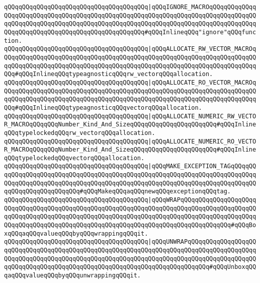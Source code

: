 \verb|qQQqqQQqqQQqqQQqqQQqqQQqqQQqqQQqqQQqqQQq|\verb#|qQQqIGNORE_MACROqQQqqQQqqQQqqQQqqQQqqQQqqQQqqQQqqQQqqQQqqQQqqQQqqQQqqQQqqQQqqQQqqQQqqQQqqQQqqQQqqQQqqQQqqQQqqQQqqQQqqQQqqQQqqQQqqQQqqQQqqQQqqQQqqQQqqQQqqQQqqQQqqQQqqQQqqQQqqQQqqQQqqQQqqQQqqQQqqQQqqQQqqQQqqQQq#\verb|#qQQqInlineqQQq"ignore"qQQqfunction.|\newline
\verb|qQQqqQQqqQQqqQQqqQQqqQQqqQQqqQQqqQQqqQQq|\verb#|qQQqALLOCATE_RW_VECTOR_MACROqQQqqQQqqQQqqQQqqQQqqQQqqQQqqQQqqQQqqQQqqQQqqQQqqQQqqQQqqQQqqQQqqQQqqQQqqQQqqQQqqQQqqQQqqQQqqQQqqQQqqQQqqQQqqQQqqQQqqQQqqQQqqQQqqQQqqQQqqQQqqQQq#\verb|#qQQqInlineqQQqtypeagnosticqQQqrw_vectorqQQqallocation.|\newline
\verb|qQQqqQQqqQQqqQQqqQQqqQQqqQQqqQQqqQQqqQQq|\verb#|qQQqALLOCATE_RO_VECTOR_MACROqQQqqQQqqQQqqQQqqQQqqQQqqQQqqQQqqQQqqQQqqQQqqQQqqQQqqQQqqQQqqQQqqQQqqQQqqQQqqQQqqQQqqQQqqQQqqQQqqQQqqQQqqQQqqQQqqQQqqQQqqQQqqQQqqQQqqQQqqQQqqQQq#\verb|#qQQqInlineqQQqtypeagnosticqQQqvectorqQQqallocation.|\newline
\verb|qQQqqQQqqQQqqQQqqQQqqQQqqQQqqQQqqQQqqQQq|\verb#|qQQqALLOCATE_NUMERIC_RW_VECTOR_MACROqQQqqQQqNumber_Kind_And_SizeqQQqqQQqqQQqqQQqqQQqqQQq#\verb|#qQQqInlineqQQqtypelockedqQQqrw_vectorqQQqallocation.|\newline
\verb|qQQqqQQqqQQqqQQqqQQqqQQqqQQqqQQqqQQqqQQq|\verb#|qQQqALLOCATE_NUMERIC_RO_VECTOR_MACROqQQqqQQqNumber_Kind_And_SizeqQQqqQQqqQQqqQQqqQQqqQQq#\verb|#qQQqInlineqQQqtypelockedqQQqvectorqQQqallocation.|\newline
\newline
\verb|qQQqqQQqqQQqqQQqqQQqqQQqqQQqqQQqqQQqqQQq|\verb#|qQQqMAKE_EXCEPTION_TAGqQQqqQQqqQQqqQQqqQQqqQQqqQQqqQQqqQQqqQQqqQQqqQQqqQQqqQQqqQQqqQQqqQQqqQQqqQQqqQQqqQQqqQQqqQQqqQQqqQQqqQQqqQQqqQQqqQQqqQQqqQQqqQQqqQQqqQQqqQQqqQQqqQQqqQQqqQQqqQQqqQQqqQQq#\verb|#qQQqMakeqQQqaqQQqnewqQQqexceptionqQQqtag.|\newline
\verb|qQQqqQQqqQQqqQQqqQQqqQQqqQQqqQQqqQQqqQQq|\verb#|qQQqWRAPqQQqqQQqqQQqqQQqqQQqqQQqqQQqqQQqqQQqqQQqqQQqqQQqqQQqqQQqqQQqqQQqqQQqqQQqqQQqqQQqqQQqqQQqqQQqqQQqqQQqqQQqqQQqqQQqqQQqqQQqqQQqqQQqqQQqqQQqqQQqqQQqqQQqqQQqqQQqqQQqqQQqqQQqqQQqqQQqqQQqqQQqqQQqqQQqqQQqqQQqqQQqqQQqqQQqqQQqqQQqqQQq#\verb|#qQQqBoxqQQqaqQQqvalueqQQqbyqQQqwrappingqQQqit.|\newline
\verb|qQQqqQQqqQQqqQQqqQQqqQQqqQQqqQQqqQQqqQQq|\verb#|qQQqUNWRAPqQQqqQQqqQQqqQQqqQQqqQQqqQQqqQQqqQQqqQQqqQQqqQQqqQQqqQQqqQQqqQQqqQQqqQQqqQQqqQQqqQQqqQQqqQQqqQQqqQQqqQQqqQQqqQQqqQQqqQQqqQQqqQQqqQQqqQQqqQQqqQQqqQQqqQQqqQQqqQQqqQQqqQQqqQQqqQQqqQQqqQQqqQQqqQQqqQQqqQQqqQQqqQQqqQQqqQQq#\verb|#qQQqUnboxqQQqaqQQqvalueqQQqbyqQQqunwrappingqQQqit.|\newline
